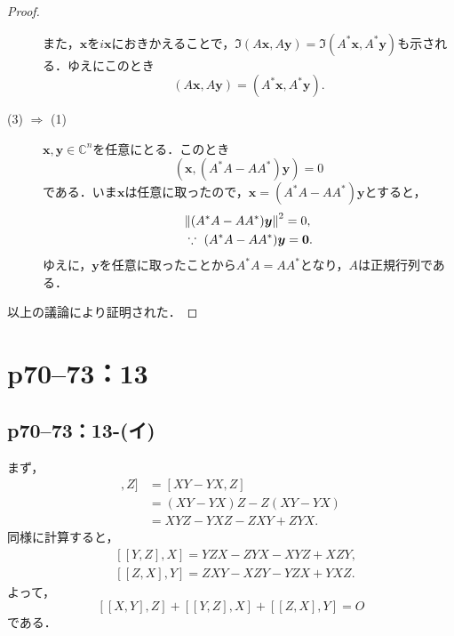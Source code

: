 \documentclass[a4paper,10pt,fleqn]{ltjsarticle}
\begin{document}
\begin{tleftbar}
\begin{proof}
\begin{description}
                  また，$\bm{x}$を$i\bm{x}$におきかえることで，$ \Im (A\bm{x}, A\bm{y}) = \Im (A^\ast \bm{x}, A^\ast\bm{y})$も示される．ゆえにこのとき
                  \[
                      (A\bm{x}, A\bm{y}) = (A^\ast \bm{x}, A^\ast\bm{y}).
                  \]
            \item[(3) $\Longrightarrow$ (1)] $\bm{x},\bm{y} \in \mathbb{C}^n$を任意にとる．このとき
                  \[
                      (\bm{x}, (A^\ast A-A A^\ast)\bm{y}) =0
                  \]
                  である．いま$\bm{x}$は任意に取ったので，$\bm{x}=(A^\ast A-A A^\ast)\bm{y}$とすると，
                  \begin{align*}
                       & \norm{(A^\ast A-A A^\ast)\bm{y}}^2  = 0,       \\
                       & \because ~ (A^\ast A-A A^\ast)\bm{y} = \bm{0}.
                  \end{align*}
                  ゆえに，$\bm{y}$を任意に取ったことから$A^\ast A=A A^\ast$となり，$A$は正規行列である．
        \end{description}
        以上の議論により証明された．
    \end{proof}
\end{tleftbar}

\newpage


\section*{p70--73：13}

\subsection*{p70--73：13-(イ)}

\begin{tleftbar}
    まず，
    \begin{align*}
        [ [X,Y],Z ] & = [XY-YX,Z]           \\
                    & = (XY-YX)Z -Z(XY-YX)  \\
                    & = XYZ -YXZ -ZXY +ZYX.
    \end{align*}
    同様に計算すると，
    \begin{align*}
         & [[Y,Z],X] = YZX -ZYX -XYZ +XZY,  \\
         & [ [Z,X],Y] = ZXY -XZY -YZX +YXZ.
    \end{align*}
    よって，
    \[
        [[X,Y],Z] +[[Y,Z],X]+[[Z,X],Y]=O
    \]
    である．
\end{tleftbar}
\end{document}
